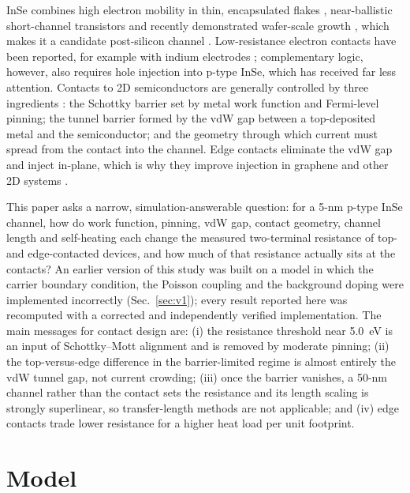 \documentclass[11pt]{article}
\begin{document}
InSe combines high electron mobility in thin, encapsulated flakes \cite{refband}, near-ballistic short-channel transistors \cite{refjiang} and recently demonstrated wafer-scale growth \cite{refqin}, which makes it a candidate post-silicon channel \cite{refsong}. Low-resistance electron contacts have been reported, for example with indium electrodes \cite{refhuang}; complementary logic, however, also requires hole injection into p-type InSe, which has received far less attention. Contacts to 2D semiconductors are generally controlled by three ingredients \cite{refallain,refkang}: the Schottky barrier set by metal work function and Fermi-level pinning; the tunnel barrier formed by the vdW gap between a top-deposited metal and the semiconductor; and the geometry through which current must spread from the contact into the channel. Edge contacts eliminate the vdW gap and inject in-plane, which is why they improve injection in graphene and other 2D systems \cite{refwang,refguim}.

This paper asks a narrow, simulation-answerable question: for a 5-nm p-type InSe channel, how do work function, pinning, vdW gap, contact geometry, channel length and self-heating each change the measured two-terminal resistance of top- and edge-contacted devices, and how much of that resistance actually sits at the contacts? An earlier version of this study was built on a model in which the carrier boundary condition, the Poisson coupling and the background doping were implemented incorrectly (Sec.~\ref{sec:v1}); every result reported here was recomputed with a corrected and independently verified implementation. The main messages for contact design are: (i) the resistance threshold near 5.0~eV is an input of Schottky--Mott alignment and is removed by moderate pinning; (ii) the top-versus-edge difference in the barrier-limited regime is almost entirely the vdW tunnel gap, not current crowding; (iii) once the barrier vanishes, a 50-nm channel rather than the contact sets the resistance and its length scaling is strongly superlinear, so transfer-length methods are not applicable; and (iv) edge contacts trade lower resistance for a higher heat load per unit footprint.

\section{Model}
\label{sec:method}
\end{document}
